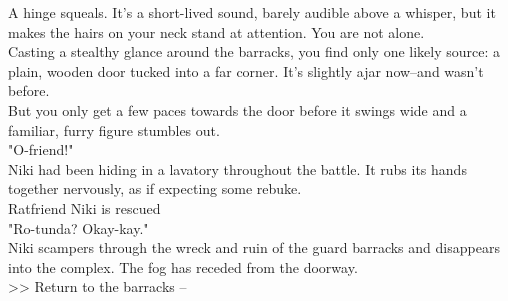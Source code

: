 A hinge squeals. It's a short-lived sound, barely audible above a whisper, but it makes the hairs on your neck stand at attention. You are not alone.\\

Casting a stealthy glance around the barracks, you find only one likely source: a plain, wooden door tucked into a far corner. It's slightly ajar now--and wasn't before.\\

But you only get a few paces towards the door before it swings wide and a familiar, furry figure stumbles out.\\

"O-friend!"\\

Niki had been hiding in a lavatory throughout the battle. It rubs its hands together nervously, as if expecting some rebuke.\\
 Ratfriend Niki is rescued\\

"Ro-tunda? Okay-kay."\\

Niki scampers through the wreck and ruin of the guard barracks and disappears into the complex. The fog has receded from the doorway.\\

>> Return to the barracks -- 